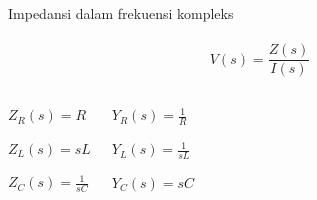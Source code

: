 \documentclass[10pt]{beamer}
\begin{document}
\begin{frame}
    Impedansi dalam frekuensi kompleks \\~\\
    $$V(s) = \frac{Z(s)}{I(s)}$$
    \begin{columns}[T,onlytextwidth]
        \begin{description}
            \item $Z_R(s) = R$
            \item $Z_L(s) = sL$
            \item $Z_C(s) = \frac{1}{sC}$
        \end{description}

        \begin{description}
            \item $Y_R(s) = \frac{1}{R}$
            \item $Y_L(s) = \frac{1}{sL}$
            \item $Y_C(s) = sC$
        \end{description}
    \end{columns}
\end{frame}
\end{document}

